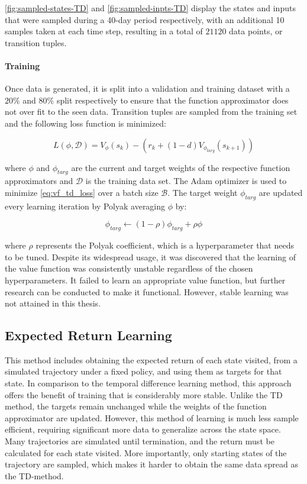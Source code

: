 \autoref{fig:sampled-states-TD} and \autoref{fig:sampled-inpts-TD} display the states and inputs that were sampled during a 40-day period respectively, with an additional 10 samples taken at each time step, resulting in a total of $21120$ data points, or transition tuples.



\paragraph{Training}
Once data is generated, it is split into a validation and training dataset with a $20\%$ and $80\%$ split respectively to ensure that the function approximator does not over fit to the seen data. Transition tuples are sampled from the training set and the following loss function is minimized:

\begin{equation}\label{eq:vf_td_loss}
    L(\phi, \mathcal{D}) =  V_{\phi}(s_k) - (r_k + (1-d) V_{\phi_{targ}} (s_{k+1}))
\end{equation}

where $\phi$ and $\phi_{targ}$ are the current and target weights of the respective function approximators and $\mathcal{D}$ is the training data set. The Adam optimizer is used to minimize \autoref{eq:vf_td_loss} over a batch size $\mathcal{B}$. The target weight $\phi_{targ}$ are updated every learning iteration by Polyak averaging $\phi$ by:

\begin{equation}
    \phi_{targ} \leftarrow (1 - \rho) \phi_{targ} + \rho \phi
\end{equation}

where $\rho$ represents the Polyak coefficient, which is a hyperparameter that needs to be tuned. Despite its widespread usage, it was discovered that the learning of the value function was consistently unstable regardless of the chosen hyperparameters. It failed to learn an appropriate value function, but further research can be conducted to make it functional. However, stable learning was not attained in this thesis.


\subsection{Expected Return Learning}
This method includes obtaining the expected return of each state visited, from a simulated trajectory under a fixed policy, and using them as targets for that state. In comparison to the temporal difference learning method, this approach offers the benefit of training that is considerably more stable. Unlike the TD method, the targets remain unchanged while the weights of the function approximator are updated. However, this method of learning is much less sample efficient, requiring significant more data to generalize across the state space. Many trajectories are simulated until termination, and the return must be calculated for each state visited. More importantly, only starting states of the trajectory are sampled, which makes it harder to obtain the same data spread as the TD-method.

